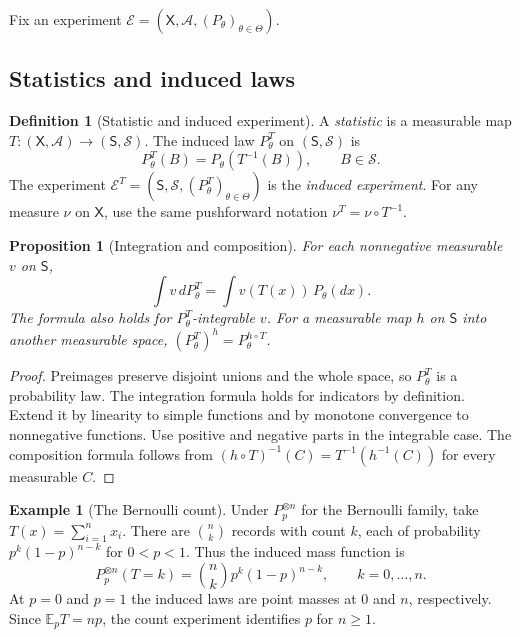 \documentclass[11pt,oneside]{book}
\newtheorem{proposition}[theorem]{Proposition}
\theoremstyle{definition}
\newtheorem{definition}[theorem]{Definition}
\newtheorem{example}[theorem]{Example}
\theoremstyle{remark}
\begin{document}
Fix an experiment
$\mathcal E=(\mathsf X,\mathcal A,(P_\theta)_{\theta\in\Theta})$.

\subsection{Statistics and induced laws}
\label{subsec:statistics-induced-laws}

\begin{definition}[Statistic and induced experiment]
\label{def:statistic-induced-experiment}
A \emph{statistic} is a measurable map
$T:(\mathsf X,\mathcal A)\to(\mathsf S,\mathcal S)$.
The induced law $P_\theta^T$ on $(\mathsf S,\mathcal S)$ is
\[
P_\theta^T(B)=P_\theta(T^{-1}(B)),\qquad B\in\mathcal S.
\]
The experiment $\mathcal E^T=(\mathsf S,\mathcal S,
(P_\theta^T)_{\theta\in\Theta})$ is the \emph{induced experiment}.
For any measure $\nu$ on $\mathsf X$, use the same pushforward
notation $\nu^T=\nu\circ T^{-1}$.
\end{definition}

\begin{proposition}[Integration and composition]
\label{prop:statistic-integration-composition}
For each nonnegative measurable $v$ on $\mathsf S$,
\[
\int v\,dP_\theta^T=\int v(T(x))\,P_\theta(dx).
\]
The formula also holds for $P_\theta^T$-integrable $v$.
For a measurable map $h$ on $\mathsf S$ into another measurable
space, $(P_\theta^T)^h=P_\theta^{h\circ T}$.
\end{proposition}
\begin{proof}
Preimages preserve disjoint unions and the whole space, so
$P_\theta^T$ is a probability law. The integration formula holds
for indicators by definition. Extend it by linearity to simple
functions and by monotone convergence to nonnegative functions.
Use positive and negative parts in the integrable case. The
composition formula follows from
$(h\circ T)^{-1}(C)=T^{-1}(h^{-1}(C))$ for every measurable $C$.
\end{proof}

\begin{example}[The Bernoulli count]
\label{ex:statistic-bernoulli-count}
Under $P_p^{\otimes n}$ for the Bernoulli family, take
$T(x)=\sum_{i=1}^n x_i$. There are $\binom nk$ records with count
$k$, each of probability $p^k(1-p)^{n-k}$ for $0<p<1$. Thus the
induced mass function is
\[
P_p^{\otimes n}(T=k)=\binom nk p^k(1-p)^{n-k},
\qquad k=0,\ldots,n.
\]
At $p=0$ and $p=1$ the induced laws are point masses at $0$ and
$n$, respectively. Since $\mathbb E_p T=np$, the count
experiment identifies $p$ for $n\geq1$.
\end{example}
\end{document}
